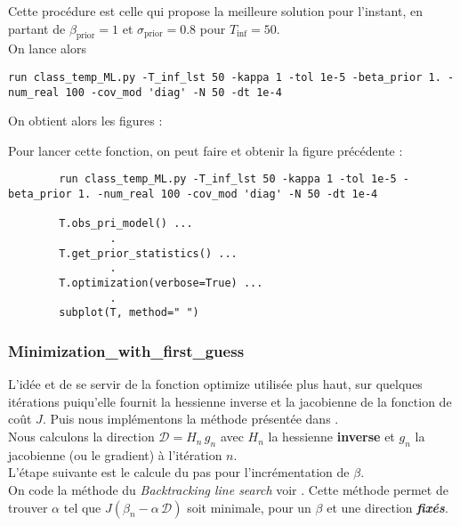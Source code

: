 \documentclass[a4paper,12pt]{article}
\newcommand{\bepar}[1]{
	\left( #1 \right)  
}
\newcommand\bk{\color{black}}
\newcommand\navy{\color{navy}}
\numberwithin{equation}{section} %
\begin{document}
\noindent Cette procédure est celle qui propose la meilleure solution pour l'instant, en partant de $\beta_{\text{prior}} = 1$ et $\sigma_{\text{prior}}=0.8$ pour $T_{\text{inf}} = 50$.\\
On lance alors 
\begin{lstlisting}
run class_temp_ML.py -T_inf_lst 50 -kappa 1 -tol 1e-5 -beta_prior 1. -num_real 100 -cov_mod 'diag' -N 50 -dt 1e-4
\end{lstlisting}
\vspace{1cm}
\noindent On obtient alors les figures : 

\pagebreak

%

\noindent Pour lancer cette fonction, on peut faire et obtenir la figure précédente :
\begin{lstlisting}
		run class_temp_ML.py -T_inf_lst 50 -kappa 1 -tol 1e-5 -beta_prior 1. -num_real 100 -cov_mod 'diag' -N 50 -dt 1e-4
	
		T.obs_pri_model() ...
				.
	    T.get_prior_statistics() ...
	    		.
	    T.optimization(verbose=True) ...
				.
		subplot(T, method=" ")    
\end{lstlisting}

\navy\subsubsection*{Minimization\_with\_first\_guess}\bk
L'idée et de se servir de la fonction optimize utilisée plus haut, sur quelques itérations puiqu'elle fournit la hessienne inverse et la jacobienne de la fonction de coût $J$. Puis nous implémentons la méthode présentée dans \cite{aria}. \\
Nous calculons la direction $\mathcal{D} = H_n\, g_n$ avec $H_n$ la hessienne \textbf{inverse} et $g_n$ la jacobienne (ou le gradient) à l'itération $n$.\\
L'étape suivante est le calcule du pas pour l'incrémentation de $\beta$. \\
On code la méthode du \textit{Backtracking line search} voir \cite{backline}. Cette méthode permet de trouver $\alpha$ tel que $J\bepar{\beta_n - \alpha\,\mathcal{D}}$ soit minimale, pour un $\beta$ et une direction \textbf{\textit{fixés}}. \\
\end{document}
